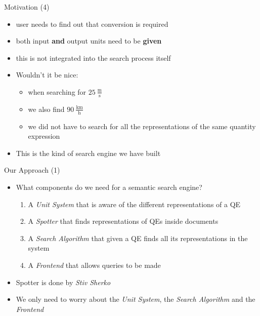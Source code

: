 \documentclass{beamer}
\begin{document}
  \begin{frame}{Motivation (4)}
    \begin{itemize}[<+->]
      \item user needs to find out that conversion is required
      \item both input \textbf{and} output units need to be \textbf{given}
      \item this is not integrated into the search process itself
      \item Wouldn't it be nice:
      \begin{itemize}[<+->]
        \item when searching for $25\ \frac{\text{m}}{\text{s}}$
        \item we also find $90\ \frac{\text{km}}{\text{h}}$
        \item we did not have to search for all the representations of the same quantity expression
      \end{itemize}
      \item This is the kind of search engine we have built
    \end{itemize}
  \end{frame}

  \begin{frame}{Our Approach (1)}
    \begin{itemize}[<+->]
      \item What components do we need for a semantic search engine?
      \begin{enumerate}[<+->]
        \item A \textit{Unit System} that is aware of the different representations of a QE
        \item A \textit{Spotter} that finds representations of QEs inside documents
        \item A \textit{Search Algorithm} that given a QE finds all its representations in the system
        \item A \textit{Frontend} that allows queries to be made
      \end{enumerate}

      \item Spotter is done by \textit{Stiv Sherko}
      \item We only need to worry about the \textit{Unit System}, the \textit{Search Algorithm} and the \textit{Frontend}
    \end{itemize}
  \end{frame}
\end{document}
